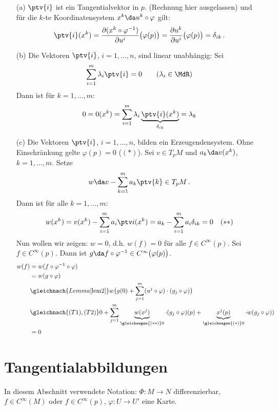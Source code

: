 \documentclass[a4paper,twoside,DIV15,BCOR12mm]{scrbook}
\begin{document}
\begin{beweis}
\begin{enumerate}
\item[(a)] $\ptv{i}$ ist ein Tangentialvektor in $p$. (Rechnung hier ausgelassen) und für die $k$-te Koordinatensystem $x^k\da u^k\circ \varphi$ gilt:
\[
\ptv{i}(x^k) = \frac{\partial (x^k\circ\varphi^{-1})}{\partial u^i}\bigl(\varphi(p)\bigr) = \frac{\partial u^k}{\partial u^i}\bigl(\varphi(p)\bigr) = \delta_{ik}\,.
\]
\item[(b)] Die Vektoren $\ptv{i}$, $i=1,\ldots,n$, sind linear unabhängig:
Sei 
\[
\sum_{i=1}^m \lambda_i \ptv{i} = 0 
\qquad (\lambda_i\in\MdR)
\]
Dann ist für $k=1,\ldots,m$:
\[
0 = 0(x^k) = 
\sum_{i=1}^m \lambda_i \underbrace{\ptv{i}(x^k)}_{\delta_{ik}} = \lambda_k
\]
\item[(c)]  Die Vektoren $\ptv{i}$, $i=1,\ldots,n$, bilden ein Erzeugendensystem. Ohne Einschränkung gelte $\varphi(p)=0$ ($(*)$). Sei $v\in T_pM$ und $a_k \da v(x^k)$, $k=1,\ldots,m$. Setze 
\[w\da v-\sum_{k=1}^m a_k \ptv{k} \in T_pM\,.\]
Dann ist für alle $k=1,\ldots,m$: 
\[
w(x^k) = v(x^k) - \sum_{i=1}^m  a_i \ptv i (x^k) = a_k - \sum_{i=1}^m  a_i \delta_{ik} = 0 \quad (**)
\]
Nun wollen wir zeigen: $w=0$, d.h. $w(f) = 0$ für alle $f\in C^{\infty}(p)$.
Sei $f\in C^\infty(p)$. Dann ist $g \da f \circ \varphi^{-1} \in C^\infty\bigl(\varphi(p)\bigr)$.
\begin{align*}
w(f) &= w(f \circ \varphi^{-1} \circ \varphi) \\
&= w(g \circ \varphi) \\
&\gleichnach{Lemma \ref{lem2}} w\bigl( g(0) + \sum_{j=1}^m (u^j\circ\varphi )\cdot(g_j \circ \varphi ) \bigr) \\
& \gleichnach{(T1),(T2)} 0 + \sum_{j=1}^m \underbrace{w(x^j)}_{\gleichwegen{(**)}0} \cdot (g_j\circ\varphi)(p) + \underbrace{x^j(p)}_{\gleichwegen{(*)}0} \cdot w(g_j \circ\varphi ) ) \\
& = 0
\end{align*}
\end{enumerate}

\end{beweis}


\section{Tangentialabbildungen}

In diesem Abschnitt verwendete Notation: $\Phi: M\to N$ differenzierbar, $f\in C^\infty(M)$ oder $f\in C^\infty(p)$, $\varphi: U \to U'$ eine Karte.
\end{document}

